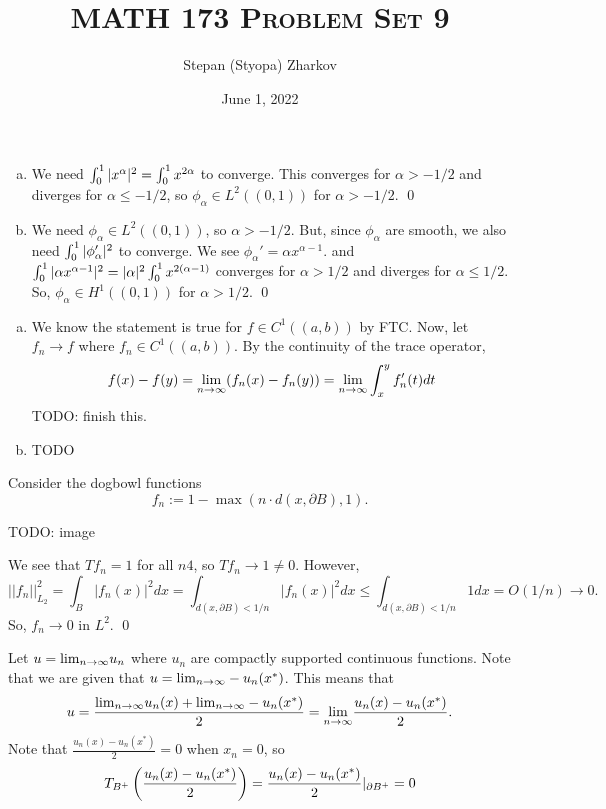 \documentclass{article}
\title{\textsc{MATH 173 Problem Set 9}}
\author{Stepan (Styopa) Zharkov}
\date{June 1, 2022}
\renewcommand{\d}{\partial}
\begin{document}
\maketitle
{} 
\tri
\hop 
\solution

\newpage
{} 
\tri
\hop 
\solution
\begin{enumerate}[(a)]
    \item We need $\int_0^1 |x^\alpha|^2 = \int_0^1 x^{2\alpha}$ to converge. This converges for $\alpha > -1/2$ and diverges for $\alpha \le -1/2$, so $\phi_\alpha \in L^2((0,1))$ for $\alpha > -1/2$. \qed
    \item We need $\phi_\alpha \in L^2((0,1))$, so $\alpha > -1/2$. But, since $\phi_\alpha$ are smooth, we also need $\int_0^1 |\phi_\alpha ' |^2$ to converge. We see $\phi_\alpha' = \alpha x^{\alpha-1}$. and $\int_0^1 |\alpha x^{\alpha-1}|^2 = |\alpha|^2\int_0^1 x^{2(\alpha-1)}$ converges for $\alpha > 1/2$ and diverges for $\alpha \le 1/2$. So, $\phi_\alpha \in H^1((0,1))$ for $\alpha > 1/2$. \qed
\end{enumerate}

\newpage
{} 
\tri
\hop 
\solution
\begin{enumerate}[(a)]
    \item We know the statement is true for $f \in C^1((a,b))$ by FTC. Now, let $f_n \to f$ where $f_n \in C^1((a,b))$. By the continuity of the trace operator, 
    \[f(x) - f(y) = {\lim_{n \to \infty}} (f_n(x)-f_n(y)) = {\lim_{n \to \infty}} \int_x^yf_n'(t)dt\]
    TODO: finish this.
    \item TODO
\end{enumerate}

\newpage
{} 
\tri
\hop 
\solution

\newpage
{} 
\tri
\hop 
\solution Consider the dogbowl functions 
\[f_n := 1-\max(n\cdot d(x, \d B), 1).\]

TODO: image

We see that $Tf_n = 1$ for all $n4$, so $Tf_n \to 1 \ne 0$. However, 
\[||f_n||_{L_2}^2 = \int_B |f_n(x)|^2dx = \int_{d(x,\d B)< 1/n} |f_n(x)|^2dx \le  \int_{d(x,\d B)< 1/n} 1 dx  = O(1/n) \to 0.\]
So, $f_n \to 0$ in $L^2$. \qed
 
\newpage
{} 
\tri
\hop 
\solution Let $u = {\lim_{n \to \infty}} u_n$ where $u_n$ are compactly supported continuous functions. Note that we are given that $u = {\lim_{n \to \infty}} -u_n(x^*)$. This means that 
\[u = \frac{ {\lim_{n \to \infty}} u_n(x) + {\lim_{n \to \infty}} -u_n(x^*)}{2}= {\lim_{n \to \infty}} \frac{u_n(x)-u_n(x^*)}{2}.\]
Note that $\frac{u_n(x)-u_n(x^*)}{2}= 0$ when $x_n =0$, so 
\[T_{B^+}\del{\frac{u_n(x)-u_n(x^*)}{2}} =\frac{u_n(x)-u_n(x^*)}{2}|_{\d B^+} = 0\]

\newpage
{} 
\tri
\hop 
\solution
\end{document}
